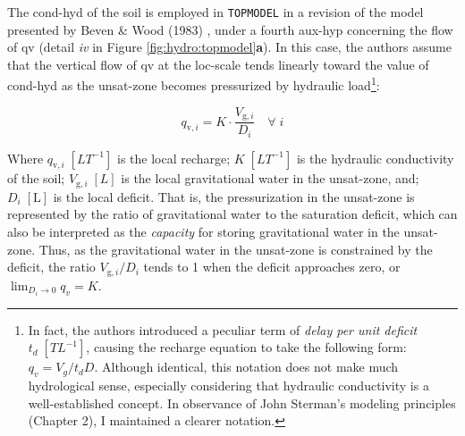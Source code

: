 \documentclass[./main_en.tex]{subfiles}
\begin{document}
\par The \gls{cond-hyd} of the soil is employed in \texttt{TOPMODEL} in a revision of the \gls{model} presented by Beven \& Wood (1983) \cite{Beven1983a}, under a fourth \gls{aux-hyp} concerning the flow of \gls{qv} (detail \textit{iv} in Figure \ref{fig:hydro:topmodel}\textbf{a}). In this case, the authors assume that the vertical flow of \gls{qv} at the \gls{loc-scale} tends linearly toward the value of \gls{cond-hyd} as the \gls{unsat-zone} becomes pressurized by hydraulic load\footnote{In fact, the authors introduced a peculiar term of \textit{delay per unit deficit} $t_d\; [TL^{-1}]$, causing the recharge equation to take the following form: $q_v = V_g / t_d D$. Although identical, this notation does not make much hydrological sense, especially considering that hydraulic conductivity is a well-established concept. In observance of John Sterman's modeling principles (Chapter 2), I maintained a clearer notation.}:
\begin{linenomath*}
\begin{equation}
\label{eq:topmodel:qv}
q_{\text{v}, i} = K \cdot \frac{V_{\text{g}, i}}{D_i}  \quad \forall \; i
\end{equation}
\end{linenomath*}
Where $q_{\text{v}, i}\;[LT^{-1}]$ is the local recharge; $K\;[LT^{-1}]$ is the hydraulic conductivity of the soil; $V_{\text{g}, i}\;[L]$ is the local gravitational water in the \gls{unsat-zone}, and; $D_{i} \; [\text{L}]$ is the local deficit. That is, the pressurization in the \gls{unsat-zone} is represented by the ratio of gravitational water to the saturation deficit, which can also be interpreted as the \textit{capacity} for storing gravitational water in the \gls{unsat-zone}. Thus, as the gravitational water in the \gls{unsat-zone} is constrained by the deficit, the ratio $V_{\text{g}, i}/D_i$ tends to 1 when the deficit approaches zero, or $\lim _{D_i \to 0} q_v= K$.
\end{document}
